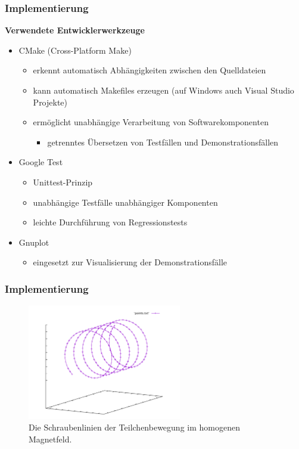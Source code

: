 \begin{frame}
  \frametitle{Implementierung}
  \onslide<+->
  \textbf{Verwendete Entwicklerwerkzeuge}
  \begin{itemize}
    \item<+-> CMake (Cross-Platform Make)
      \begin{itemize}
        \item<+-> erkennt automatisch Abh\"angigkeiten zwischen den Quelldateien
        \item<+-> kann automatisch Makefiles erzeugen (auf Windows auch Visual Studio Projekte)
        \item<+-> erm\"oglicht unabh\"angige Verarbeitung von Softwarekomponenten
          \begin{itemize}
            \item<+-> getrenntes \"Ubersetzen von Testf\"allen und Demonstrationsf\"allen
          \end{itemize}
      \end{itemize}
    \item<+-> Google Test
      \begin{itemize}
        \item<+-> Unittest-Prinzip
        \item<+-> unabh\"angige Testf\"alle unabh\"angiger Komponenten
        \item<+-> leichte Durchf\"uhrung von Regressionstests
      \end{itemize}
    \item<+-> Gnuplot
      \begin{itemize}
        \item<+-> eingesetzt zur Visualisierung der Demonstrationsf\"alle
      \end{itemize}
  \end{itemize}
\end{frame}

\begin{frame}
  \frametitle{Implementierung}
  \begin{figure}
    \centering
    \includegraphics[width=0.6\textwidth]{../gnuplot/homogeneous}
    \caption{Die Schraubenlinien der Teilchenbewegung im homogenen Magnetfeld.}
    \label{fig:homogeneous_plot}
  \end{figure}
\end{frame}

